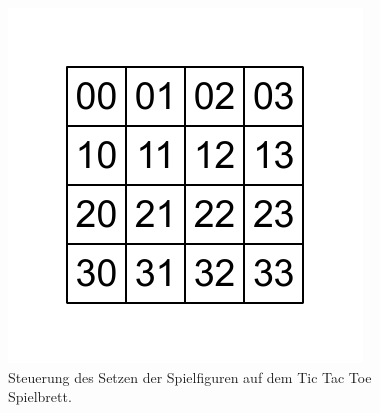 \begin{figure}[!htbp]
  \centering
  \includegraphics[scale = 1]{inhalt/abbildungen/vier_mal_vier_matrix.pdf}
  \caption{Steuerung des Setzen der Spielfiguren auf dem Tic Tac Toe Spielbrett.}
  \label{fig:kreiseUndKreuzeSetzen}
\end{figure}



